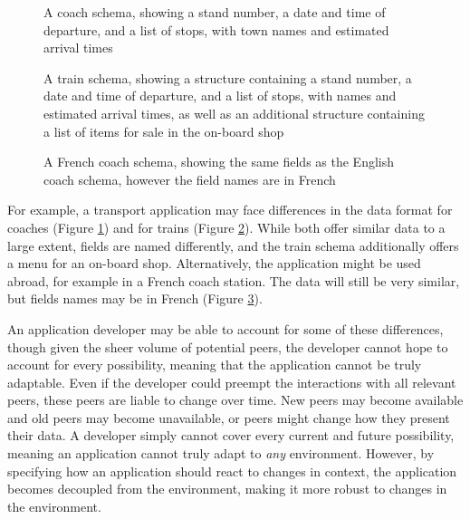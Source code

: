 \documentclass[12pt,twoside,notitlepage]{report}
\begin{document}
\begin{figure}

\caption[Example Schema for a Coach]{A coach schema, showing a stand number, a date and time of departure, and a list of stops, with town names and estimated arrival times}
\label{fig:coach-schema-intro}
\end{figure}

\begin{figure}

\caption[Example Schema for a Train]{A train schema, showing a structure containing a stand number, a date and time of departure, and a list of stops, with names and estimated arrival times, as well as an additional structure containing a list of items for sale in the on-board shop}
\label{fig:train-schema-intro}
\end{figure}

\begin{figure}

\caption[Example Schema for a French Coach]{A French coach schema, showing the same fields as the English coach schema, however the field names are in French}
\label{fig:french-coach-schema-intro}
\end{figure}

For example, a transport application may face differences in the data format for coaches (Figure \ref{fig:coach-schema-intro}) and for trains (Figure \ref{fig:train-schema-intro}). 
While both offer similar data to a large extent, fields are named differently, and the train schema additionally offers a menu for an on-board shop.
Alternatively, the application might be used abroad, for example in a French coach station. The data will still be very similar, but fields names may be in French (Figure \ref{fig:french-coach-schema-intro}).

An application developer may be able to account for some of these differences, though given the sheer volume of potential peers, the developer cannot hope to account for every possibility, meaning that the application cannot be truly adaptable. 
Even if the developer could preempt the interactions with all relevant peers, these peers are liable to change over time. 
New peers may become available and old peers may become unavailable, or peers might change how they present their data. 
A developer simply cannot cover every current and future possibility, meaning an application cannot truly adapt to {\sl any} environment. 
However, by specifying how an application should react to changes in context, the application becomes decoupled from the environment, making it more robust to changes in the environment. 
\end{document}
